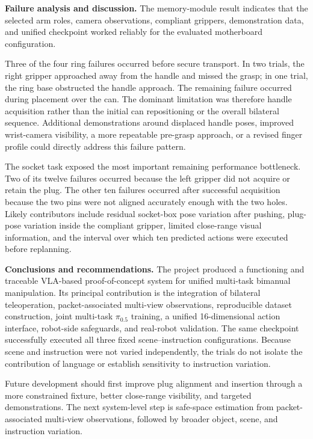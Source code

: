 \begin{digest}
\noindent\textbf{Failure analysis and discussion.}
The memory-module result indicates that the selected arm roles, camera observations, compliant grippers, demonstration data, and unified checkpoint worked reliably for the evaluated motherboard configuration.

Three of the four ring failures occurred before secure transport. In two trials, the right gripper approached away from the handle and missed the grasp; in one trial, the ring base obstructed the handle approach. The remaining failure occurred during placement over the can. The dominant limitation was therefore handle acquisition rather than the initial can repositioning or the overall bilateral sequence. Additional demonstrations around displaced handle poses, improved wrist-camera visibility, a more repeatable pre-grasp approach, or a revised finger profile could directly address this failure pattern.

The socket task exposed the most important remaining performance bottleneck. Two of its twelve failures occurred because the left gripper did not acquire or retain the plug. The other ten failures occurred after successful acquisition because the two pins were not aligned accurately enough with the two holes. Likely contributors include residual socket-box pose variation after pushing, plug-pose variation inside the compliant gripper, limited close-range visual information, and the interval over which ten predicted actions were executed before replanning.

\noindent\textbf{Conclusions and recommendations.}
The project produced a functioning and traceable VLA-based proof-of-concept system for unified multi-task bimanual manipulation. Its principal contribution is the integration of bilateral teleoperation, packet-associated multi-view observations, reproducible dataset construction, joint multi-task $\pi_{0.5}$ training, a unified 16-dimensional action interface, robot-side safeguards, and real-robot validation. The same checkpoint successfully executed all three fixed scene--instruction configurations. Because scene and instruction were not varied independently, the trials do not isolate the contribution of language or establish sensitivity to instruction variation.

Future development should first improve plug alignment and insertion through a more constrained fixture, better close-range visibility, and targeted demonstrations. The next system-level step is safe-space estimation from packet-associated multi-view observations, followed by broader object, scene, and instruction variation.

\end{digest}
